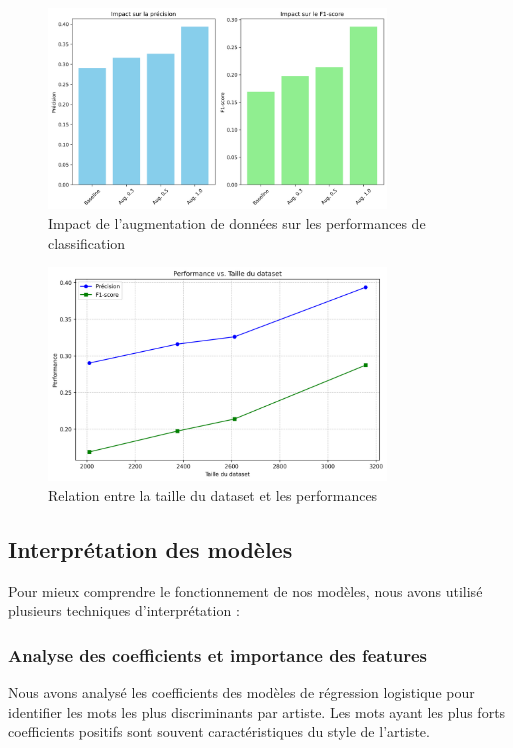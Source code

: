 \documentclass[a4paper,11pt]{article}
\begin{document}
\begin{figure}[ht]
    \centering
    \includegraphics[width=0.8\textwidth]{results_rapport/augmentation_impact.png}
    \caption{Impact de l'augmentation de données sur les performances de classification}
    \label{fig:augmentation-impact}
\end{figure}

\begin{figure}[ht]
    \centering
    \includegraphics[width=0.8\textwidth]{results_rapport/dataset_size_vs_performance.png}
    \caption{Relation entre la taille du dataset et les performances}
    \label{fig:dataset-size-vs-performance}
\end{figure}

\subsection{Interprétation des modèles}
\label{subsec:interpretation}

Pour mieux comprendre le fonctionnement de nos modèles, nous avons utilisé plusieurs techniques d'interprétation :

\subsubsection{Analyse des coefficients et importance des features}
Nous avons analysé les coefficients des modèles de régression logistique pour identifier les mots les plus discriminants par artiste. Les mots ayant les plus forts coefficients positifs sont souvent caractéristiques du style de l'artiste.
\end{document}
